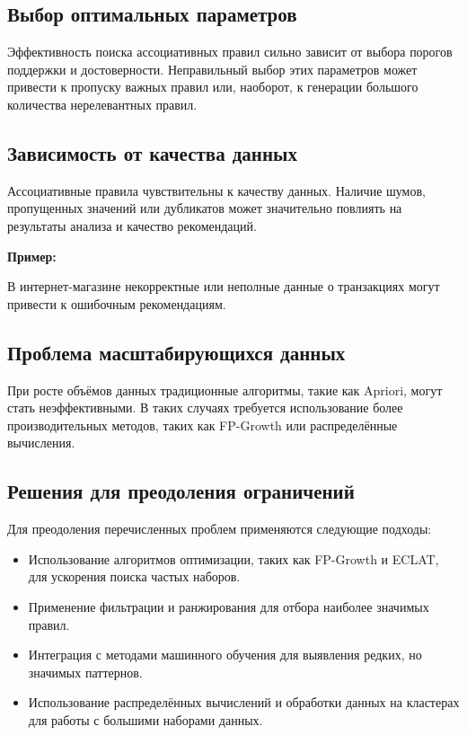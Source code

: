 \documentclass[a4paper,12pt]{article}
\begin{document}
\subsection{Выбор оптимальных параметров}

Эффективность поиска ассоциативных правил сильно зависит от выбора порогов поддержки и достоверности. Неправильный выбор этих параметров может привести к пропуску важных правил или, наоборот, к генерации большого количества нерелевантных правил.

\subsection{Зависимость от качества данных}

Ассоциативные правила чувствительны к качеству данных. Наличие шумов, пропущенных значений или дубликатов может значительно повлиять на результаты анализа и качество рекомендаций.

\textbf{Пример:}

В интернет-магазине некорректные или неполные данные о транзакциях могут привести к ошибочным рекомендациям.

\subsection{Проблема масштабирующихся данных}

При росте объёмов данных традиционные алгоритмы, такие как Apriori, могут стать неэффективными. В таких случаях требуется использование более производительных методов, таких как FP-Growth или распределённые вычисления.

\subsection{Решения для преодоления ограничений}

Для преодоления перечисленных проблем применяются следующие подходы:

\begin{itemize}
    \item Использование алгоритмов оптимизации, таких как FP-Growth и ECLAT, для ускорения поиска частых наборов.
    \item Применение фильтрации и ранжирования для отбора наиболее значимых правил.
    \item Интеграция с методами машинного обучения для выявления редких, но значимых паттернов.
    \item Использование распределённых вычислений и обработки данных на кластерах для работы с большими наборами данных.
\end{itemize}
\end{document}
